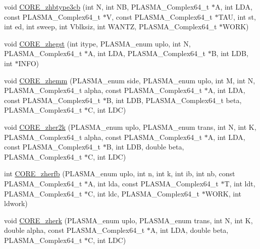 \begin{DoxyCompactItemize}
\item 
void \hyperlink{group__CORE__PLASMA__Complex64__t_gae13224de0a3d8720f1264e9531e0103e_gae13224de0a3d8720f1264e9531e0103e}{C\+O\+R\+E\+\_\+zhbtype3cb} (int N, int N\+B, P\+L\+A\+S\+M\+A\+\_\+\+Complex64\+\_\+t $\ast$A, int L\+D\+A, const P\+L\+A\+S\+M\+A\+\_\+\+Complex64\+\_\+t $\ast$V, const P\+L\+A\+S\+M\+A\+\_\+\+Complex64\+\_\+t $\ast$T\+A\+U, int st, int ed, int sweep, int Vblksiz, int W\+A\+N\+T\+Z, P\+L\+A\+S\+M\+A\+\_\+\+Complex64\+\_\+t $\ast$W\+O\+R\+K)
\item 
void \hyperlink{group__CORE__PLASMA__Complex64__t_ga2edbf0b9d448909ce5bad7e36648da6c_ga2edbf0b9d448909ce5bad7e36648da6c}{C\+O\+R\+E\+\_\+zhegst} (int itype, P\+L\+A\+S\+M\+A\+\_\+enum uplo, int N, P\+L\+A\+S\+M\+A\+\_\+\+Complex64\+\_\+t $\ast$A, int L\+D\+A, P\+L\+A\+S\+M\+A\+\_\+\+Complex64\+\_\+t $\ast$B, int L\+D\+B, int $\ast$I\+N\+F\+O)
\item 
void \hyperlink{group__CORE__PLASMA__Complex64__t_ga47ea416aa98c64bf7581877da2cca565_ga47ea416aa98c64bf7581877da2cca565}{C\+O\+R\+E\+\_\+zhemm} (P\+L\+A\+S\+M\+A\+\_\+enum side, P\+L\+A\+S\+M\+A\+\_\+enum uplo, int M, int N, P\+L\+A\+S\+M\+A\+\_\+\+Complex64\+\_\+t alpha, const P\+L\+A\+S\+M\+A\+\_\+\+Complex64\+\_\+t $\ast$A, int L\+D\+A, const P\+L\+A\+S\+M\+A\+\_\+\+Complex64\+\_\+t $\ast$B, int L\+D\+B, P\+L\+A\+S\+M\+A\+\_\+\+Complex64\+\_\+t beta, P\+L\+A\+S\+M\+A\+\_\+\+Complex64\+\_\+t $\ast$C, int L\+D\+C)
\item 
void \hyperlink{group__CORE__PLASMA__Complex64__t_ga6b7e2fd789a2ef16095d7d29f6400b45_ga6b7e2fd789a2ef16095d7d29f6400b45}{C\+O\+R\+E\+\_\+zher2k} (P\+L\+A\+S\+M\+A\+\_\+enum uplo, P\+L\+A\+S\+M\+A\+\_\+enum trans, int N, int K, P\+L\+A\+S\+M\+A\+\_\+\+Complex64\+\_\+t alpha, const P\+L\+A\+S\+M\+A\+\_\+\+Complex64\+\_\+t $\ast$A, int L\+D\+A, const P\+L\+A\+S\+M\+A\+\_\+\+Complex64\+\_\+t $\ast$B, int L\+D\+B, double beta, P\+L\+A\+S\+M\+A\+\_\+\+Complex64\+\_\+t $\ast$C, int L\+D\+C)
\item 
int \hyperlink{group__CORE__PLASMA__Complex64__t_gaa6579ca0848de67f932a156da4561793_gaa6579ca0848de67f932a156da4561793}{C\+O\+R\+E\+\_\+zherfb} (P\+L\+A\+S\+M\+A\+\_\+enum uplo, int n, int k, int ib, int nb, const P\+L\+A\+S\+M\+A\+\_\+\+Complex64\+\_\+t $\ast$A, int lda, const P\+L\+A\+S\+M\+A\+\_\+\+Complex64\+\_\+t $\ast$T, int ldt, P\+L\+A\+S\+M\+A\+\_\+\+Complex64\+\_\+t $\ast$C, int ldc, P\+L\+A\+S\+M\+A\+\_\+\+Complex64\+\_\+t $\ast$W\+O\+R\+K, int ldwork)
\item 
void \hyperlink{group__CORE__PLASMA__Complex64__t_gabffbaa9f4b4e32a1ec3da078618763b9_gabffbaa9f4b4e32a1ec3da078618763b9}{C\+O\+R\+E\+\_\+zherk} (P\+L\+A\+S\+M\+A\+\_\+enum uplo, P\+L\+A\+S\+M\+A\+\_\+enum trans, int N, int K, double alpha, const P\+L\+A\+S\+M\+A\+\_\+\+Complex64\+\_\+t $\ast$A, int L\+D\+A, double beta, P\+L\+A\+S\+M\+A\+\_\+\+Complex64\+\_\+t $\ast$C, int L\+D\+C)

\end{DoxyCompactItemize}
